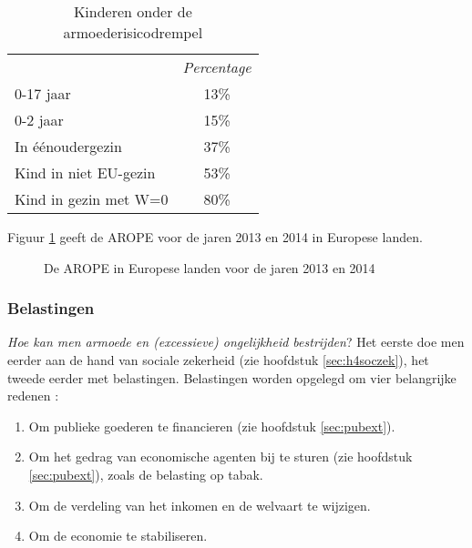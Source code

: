 \begin{table}[H]
\centering
\begin{tabular}{lc}
\rowcolor[HTML]{EFEFEF} 
\multicolumn{1}{c}{\cellcolor[HTML]{EFEFEF}\textit{Categorie}} & \textit{Percentage} \\
0-17 jaar & 13\% \\
0-2 jaar & 15\% \\
In \'e\'enoudergezin & 37\% \\
Kind in niet EU-gezin & 53\% \\
Kind in gezin met W=0 & 80\%
\end{tabular}
\caption{Kinderen onder de armoederisicodrempel}
\label{tab:h4-kindarm}
\end{table}

Figuur \ref{fig:h4-arope} geeft de AROPE voor de jaren 2013 en 2014 in Europese landen.

\begin{figure}[H]
\small\centering\captionsetup{justification=centering,margin=2cm}
\caption{De AROPE in Europese landen voor de jaren 2013 en 2014}
\label{fig:h4-arope}
\end{figure}

\subsubsection{Belastingen}

\textit{Hoe kan men armoede en (excessieve) ongelijkheid bestrijden}? Het eerste doe men eerder aan de hand van sociale zekerheid (zie hoofdstuk \ref{sec:h4soczek}), het tweede eerder met belastingen. Belastingen worden opgelegd om vier belangrijke redenen :
\begin{enumerate}
\item Om publieke goederen te financieren (zie hoofdstuk \ref{sec:pubext}).
\item Om het gedrag van economische agenten bij te sturen (zie hoofdstuk \ref{sec:pubext}), zoals de belasting op tabak.
\item Om de verdeling van het inkomen en de welvaart te wijzigen.
\item Om de economie te stabiliseren.
\end{enumerate}

